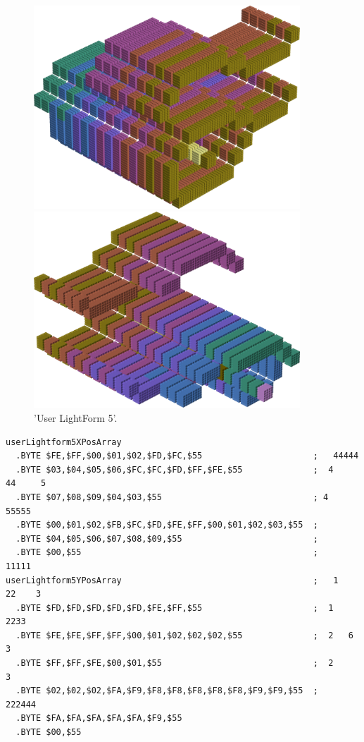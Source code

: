 \begin{figure}[H]
    \centering
    \begin{adjustbox}{width=10cm,center}
      \includegraphics[width=10cm]{src/colorspace_patterns/pattern13-45.png}%
    \end{adjustbox}
    \begin{adjustbox}{width=10cm}
      \includegraphics[width=10cm]{src/colorspace_patterns/pattern13-225.png}%
    \end{adjustbox}
\caption{'User LightForm 5'.}
\end{figure}
\clearpage

\begin{lstlisting}[basicstyle=\ttfamily\scriptsize]
userLightform5XPosArray
  .BYTE $FE,$FF,$00,$01,$02,$FD,$FC,$55                      ;   44444        
  .BYTE $03,$04,$05,$06,$FC,$FC,$FD,$FF,$FE,$55              ;  4     44     5
  .BYTE $07,$08,$09,$04,$03,$55                              ; 4        55555 
  .BYTE $00,$01,$02,$FB,$FC,$FD,$FE,$FF,$00,$01,$02,$03,$55  ;                
  .BYTE $04,$05,$06,$07,$08,$09,$55                          ;                
  .BYTE $00,$55                                              ;    11111       
userLightform5YPosArray                                      ;   1     22    3
  .BYTE $FD,$FD,$FD,$FD,$FD,$FE,$FF,$55                      ;  1        2233 
  .BYTE $FE,$FE,$FF,$FF,$00,$01,$02,$02,$02,$55              ;  2   6   3     
  .BYTE $FF,$FF,$FE,$00,$01,$55                              ;  2      3      
  .BYTE $02,$02,$02,$FA,$F9,$F8,$F8,$F8,$F8,$F8,$F9,$F9,$55  ;   222444       
  .BYTE $FA,$FA,$FA,$FA,$FA,$F9,$55
  .BYTE $00,$55
\end{lstlisting}


